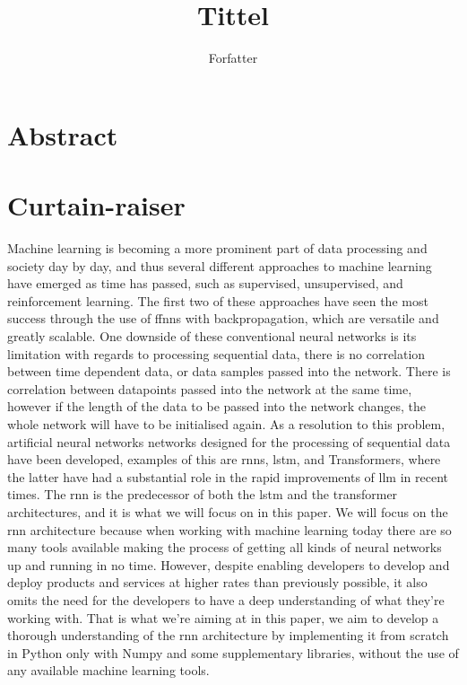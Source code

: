 \documentclass[12pt]{article}
\title{Tittel}
\author{Forfatter}
\date{}
\begin{document}
\maketitle

\section{Abstract}



\section{Curtain-raiser}

Machine learning is becoming a more prominent part of data processing and society day by day, and thus several different approaches to machine learning have emerged as time has passed, such as supervised, unsupervised, and reinforcement learning. The first two of these approaches have seen the most success through the use of \gls{ffnn}s with backpropagation, which are versatile and greatly scalable. One downside of these conventional neural networks is its limitation with regards to processing sequential data, there is no correlation between time dependent data, or data samples passed into the network. There is correlation between datapoints passed into the network at the same time, however if the length of the data to be passed into the network changes, the whole network will have to be initialised again. As a resolution to this problem, artificial neural networks networks designed for the processing of sequential data have been developed, examples of this are \gls{rnn}s, \gls{lstm}, and Transformers, where the latter have had a substantial role in the rapid improvements of \gls{llm} in recent times. The \gls{rnn} is the predecessor of both the \gls{lstm} and the transformer architectures, and it is what we will focus on in this paper. We will focus on the \gls{rnn} architecture because when working with machine learning today there are so many tools available making the process of getting all kinds of neural networks up and running in no time. However, despite enabling developers to develop and deploy products and services at higher rates than previously possible, it also omits the need for the developers to have a deep understanding of what they're working with. That is what we're aiming at in this paper, we aim to develop a thorough understanding of the \gls{rnn} architecture by implementing it from scratch in Python only with Numpy and some supplementary libraries, without the use of any available machine learning tools.
\end{document}
